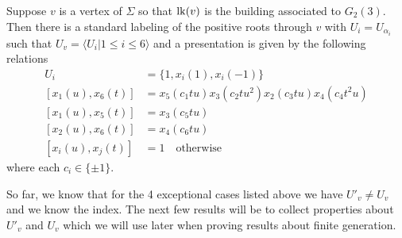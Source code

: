 \documentclass[class=book, crop=false,12 pt]{standalone}
\begin{document}
\begin{lemma}
	\label{lem:g23pres}
	Suppose $v$ is a vertex of $\Sigma$ so that $\mathrm{lk}(v)$ is the building associated to $G_2(3).$ Then there is a standard labeling of the positive roots through $v$ with $U_i=U_{\alpha_i}$ such that $U_v=\langle U_i|1\le i\le 6\rangle$ and a presentation is given by the following relations
	\begin{align*}
		U_i&=\{1,x_i(1),x_i(-1)\}\\
		[x_1(u),x_6(t)]&=x_5(c_1 tu)x_3(c_2 tu^2)x_2(c_3 tu)x_4(c_4 t^2u)\\
		[x_1(u),x_5(t)]&=x_3(c_5 tu)\\
		[x_2(u),x_6(t)]&=x_4(c_6 tu)\\
		[x_i(u),x_j(t)]&=1 \quad \text{otherwise}
	\end{align*}
where each $c_i\in \{\pm 1\}.$
\end{lemma}

So far, we know that for the 4 exceptional cases listed above we have $U'_v\neq U_v$ and we know the index. The next few results will be to collect properties about $U'_v$ and $U_v$ which we will use later when proving results about finite generation.
\end{document}
